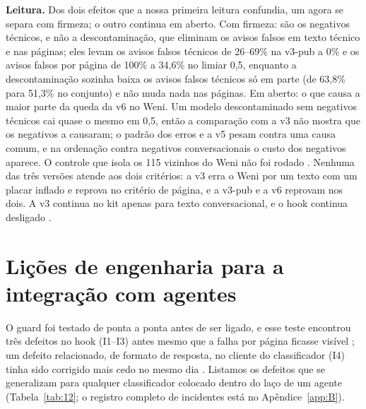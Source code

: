 \documentclass[11pt]{article}
\begin{document}
\textbf{Leitura.} Dos dois efeitos que a nossa primeira leitura confundia, um agora se separa com firmeza; o outro continua em aberto. Com firmeza: são os negativos técnicos, e não a descontaminação, que eliminam os avisos falsos em texto técnico e nas páginas; eles levam os avisos falsos técnicos de 26–69\% na v3-pub a 0\% e os avisos falsos por página de 100\% a 34,6\% no limiar 0,5, enquanto a descontaminação sozinha baixa os avisos falsos técnicos só em parte (de 63,8\% para 51,3\% no conjunto) e não muda nada nas páginas. Em aberto: o que causa a maior parte da queda da v6 no Weni. Um modelo descontaminado sem negativos técnicos cai quase o mesmo em 0,5, então a comparação com a v3 não mostra que os negativos a causaram; o padrão dos erros e a v5 pesam contra uma causa comum, e na ordenação contra negativos conversacionais o custo dos negativos aparece. O controle que isola os 115 vizinhos do Weni não foi rodado%
. Nenhuma das três versões atende aos dois critérios: a v3 erra o Weni por um texto com um placar inflado e reprova no critério de página, e a v3-pub e a v6 reprovam nos dois. A v3 continua no kit apenas para texto conversacional, e o hook continua desligado%
.

\section{Lições de engenharia para a integração com agentes}\label{sec:8}

O guard foi testado de ponta a ponta antes de ser ligado, e esse teste encontrou três defeitos no hook (I1–I3) antes mesmo que a falha por página ficasse visível%
; um defeito relacionado, de formato de resposta, no cliente do classificador (I4) tinha sido corrigido mais cedo no mesmo dia%
. Listamos os defeitos que se generalizam para qualquer classificador colocado dentro do laço de um agente (Tabela~\ref{tab:12}; o registro completo de incidentes está no Apêndice~\ref{app:B}).
\end{document}
